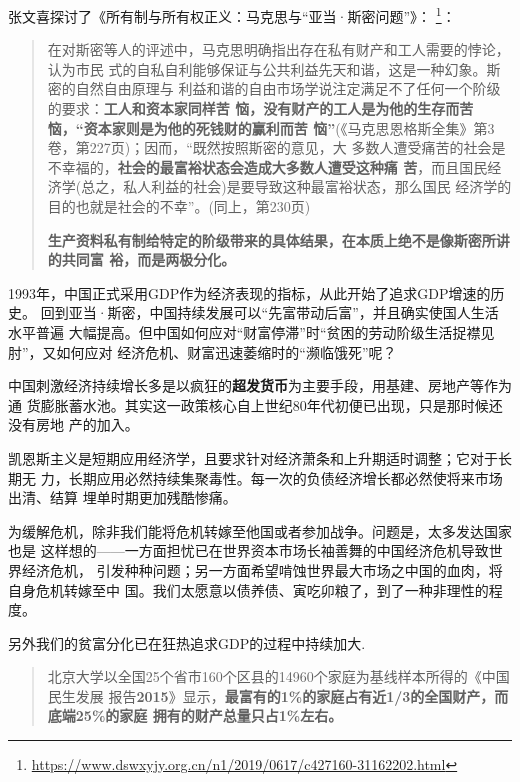 张文喜探讨了《所有制与所有权正义：马克思与“亚当·斯密问题”》\cite{ZXYJ201404002}：
\footnote{\url{https://www.dswxyjy.org.cn/n1/2019/0617/c427160-31162202.html}}：
\begin{quotation}
  在对斯密等人的评述中，马克思明确指出存在私有财产和工人需要的悖论，认为市民
  式的自私自利能够保证与公共利益先天和谐，这是一种幻象。斯密的自然自由原理与
  利益和谐的自由市场学说注定满足不了任何一个阶级的要求：\textbf{工人和资本家同样苦
  恼，没有财产的工人是为他的生存而苦恼，“资本家则是为他的死钱财的赢利而苦
    恼”}(《马克思恩格斯全集》第3卷，第227页)；因而，“既然按照斯密的意见，大
  多数人遭受痛苦的社会是不幸福的，\textbf{社会的最富裕状态会造成大多数人遭受这种痛
    苦}，而且国民经济学(总之，私人利益的社会)是要导致这种最富裕状态，那么国民
  经济学的目的也就是社会的不幸”。(同上，第230页)

  \textbf{生产资料私有制给特定的阶级带来的具体结果，在本质上绝不是像斯密所讲的共同富
  裕，而是两极分化。}
\end{quotation}


1993年，中国正式采用GDP作为经济表现的指标，从此开始了追求GDP增速的历史。
回到亚当·斯密，中国持续发展可以“先富带动后富”，并且确实使国人生活水平普遍
大幅提高。但中国如何应对“财富停滞”时“贫困的劳动阶级生活捉襟见肘”，又如何应对
经济危机、财富迅速萎缩时的“濒临饿死”呢？

中国刺激经济持续增长多是以疯狂的\textbf{超发货币}为主要手段，用基建、房地产等作为通
货膨胀蓄水池。其实这一政策核心自上世纪80年代初便已出现，只是那时候还没有房地
产的加入。

凯恩斯主义是短期应用经济学，且要求针对经济萧条和上升期适时调整；它对于长期无
力，长期应用必然持续集聚毒性。每一次的负债经济增长都必然使将来市场出清、结算
埋单时期更加残酷惨痛。

为缓解危机，除非我们能将危机转嫁至他国或者参加战争。问题是，太多发达国家也是
这样想的——一方面担忧已在世界资本市场长袖善舞的中国经济危机导致世界经济危机，
引发种种问题；另一方面希望啃蚀世界最大市场之中国的血肉，将自身危机转嫁至中
国。我们太愿意以债养债、寅吃卯粮了，到了一种非理性的程度。

另外我们的贫富分化已在狂热追求GDP的过程中持续加大.

\begin{quotation}
  北京大学以全国25个省市160个区县的14960个家庭为基线样本所得的《中国民生发展
  报告\textbf{2015}》显示，\textbf{最富有的1\%的家庭占有近1/3的全国财产，而底端25\%的家庭
    拥有的财产总量只占1\%左右。}\cite{dajueqi}
\end{quotation}

